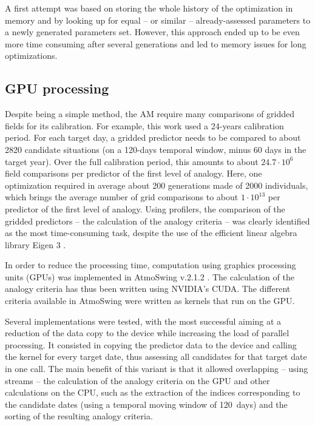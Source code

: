 \documentclass[draft]{agujournal2019}
\begin{document}
A first attempt was based on storing the whole history of the optimization in memory and by looking up for equal -- or similar -- already-assessed parameters to a newly generated parameters set. However, this approach ended up to be even more time consuming after several generations and led to memory issues for long optimizations.



\subsection{GPU processing}

Despite being a simple method, the AM require many comparisons of gridded fields for its calibration. For example, this work used a 24-years calibration period. For each target day, a gridded predictor needs to be compared to about 2820 candidate situations (on a 120-days temporal window, minus 60 days in the target year). Over the full calibration period, this amounts to about $24.7\cdot10^6$ field comparisons per predictor of the first level of analogy. Here, one optimization required in average about 200 generations made of 2000 individuals, which brings the average number of grid comparisons to about $1\cdot10^{13}$ per predictor of the first level of analogy. Using profilers, the comparison of the gridded predictors -- the calculation of the analogy criteria -- was clearly identified as the most time-consuming task, despite the use of the efficient linear algebra library Eigen 3 \cite{Guennebaud2010}.

In order to reduce the processing time, computation using graphics processing units (GPUs) was implemented in AtmoSwing v.2.1.2 \cite{Horton2019b}. The calculation of the analogy criteria has thus been written using NVIDIA's CUDA. The different criteria available in AtmoSwing were written as kernels that run on the GPU.

Several implementations were tested, with the most successful aiming at a reduction of the data copy to the device while increasing the load of parallel processing. It consisted in copying the predictor data to the device and calling the kernel for every target date, thus assessing all candidates for that target date in one call. The main benefit of this variant is that it allowed overlapping -- using streams -- the calculation of the analogy criteria on the GPU and other calculations on the CPU, such as the extraction of the indices corresponding to the candidate dates (using a temporal moving window of 120~days) and the sorting of the resulting analogy criteria.
\end{document}

